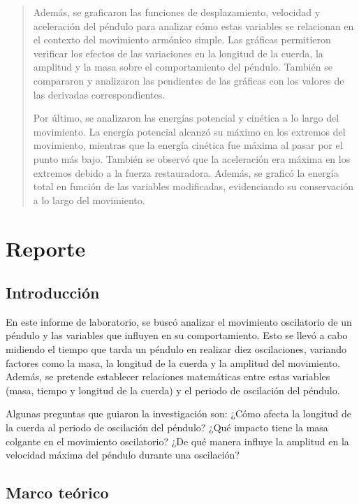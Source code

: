 \documentclass[letterpaper]{report}
\numberwithin{table}{section}
\begin{document}
\begin{abstract}
  Además, se graficaron las funciones de desplazamiento, velocidad y
  aceleración del péndulo para analizar cómo estas variables se
  relacionan en el contexto del movimiento armónico simple. Las
  gráficas permitieron verificar los efectos de las variaciones en la
  longitud de la cuerda, la amplitud y la masa sobre el
  comportamiento del péndulo. También se compararon y analizaron las
  pendientes de las gráficas con los valores de las derivadas correspondientes.

  Por último, se analizaron las energías potencial y cinética a lo
  largo del movimiento. La energía potencial alcanzó su máximo en los
  extremos del movimiento, mientras que la energía cinética fue
  máxima al pasar por el punto más bajo. También se observó que la
  aceleración era máxima en los extremos debido a la fuerza
  restauradora. Además, se graficó la energía total en función de las
  variables modificadas, evidenciando su conservación a lo largo del movimiento.
\end{abstract}

\chapter{Reporte}

\section{Introducción}

En este informe de laboratorio, se buscó analizar el movimiento
oscilatorio de un péndulo y las variables que influyen en su
comportamiento. Esto se llevó a cabo midiendo el tiempo que tarda un
péndulo en realizar diez oscilaciones, variando factores como la
masa, la longitud de la cuerda y la amplitud del movimiento. Además,
se pretende establecer relaciones matemáticas entre estas variables
(masa, tiempo y longitud de la cuerda) y el periodo de oscilación del
péndulo.

Algunas preguntas que guiaron la investigación son: ¿Cómo
afecta la longitud de la cuerda al periodo de oscilación del péndulo?
¿Qué impacto tiene la masa colgante en el movimiento oscilatorio? ¿De
qué manera influye la amplitud en la velocidad máxima del péndulo
durante una oscilación?

\section{Marco teórico}
\end{document}
